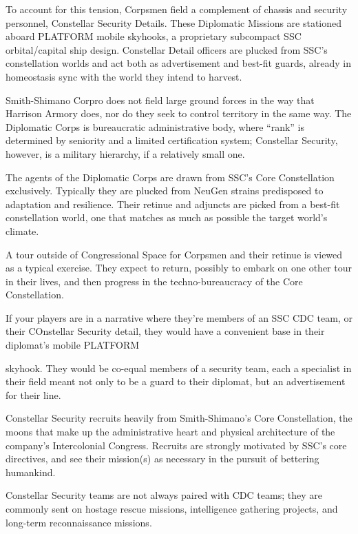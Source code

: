 To account for this tension, Corpsmen field a complement of chassis and security personnel,  
Constellar Security Details. These Diplomatic Missions are stationed aboard PLATFORM mobile  
skyhooks, a proprietary subcompact SSC orbital/capital ship design. Constellar Detail officers are  
plucked from SSC’s constellation worlds and act both as advertisement and best-fit guards,  
already in homeostasis sync with the world they intend to harvest.   

Smith-Shimano Corpro does not field large ground forces in the way that Harrison Armory does,  
nor do they seek to control territory in the same way. The Diplomatic Corps is bureaucratic  
administrative body, where “rank” is determined by seniority and a limited certification system;  
Constellar Security, however, is a military hierarchy, if a relatively small one.    

The agents of the Diplomatic Corps are drawn from SSC’s Core Constellation exclusively.  
Typically they are plucked from NeuGen strains predisposed to adaptation and resilience. Their  
retinue and adjuncts are picked from a best-fit constellation world, one that matches as much as  
possible the target world’s climate.   

A tour outside of Congressional Space for Corpsmen and their retinue is viewed as a typical  
exercise. They expect to return, possibly to embark on one other tour in their lives, and then  
progress in the techno-bureaucracy of the Core Constellation.         

If your players are in a narrative where they’re members of an SSC CDC team, or their COnstellar  
Security detail, they would have  a convenient base in their diplomat’s mobile PLATFORM  

                                                                                                          


skyhook. They would be co-equal members of a security team, each a specialist in their field  
meant not only to be a guard to their diplomat, but an advertisement for their line.  

Constellar Security recruits heavily from Smith-Shimano’s Core Constellation, the moons that  
make up the administrative heart and physical architecture of the company’s Intercolonial  
Congress. Recruits are strongly motivated by SSC’s core directives, and see their mission(s) as  
necessary in the pursuit of bettering humankind.   

Constellar Security teams are not always paired with CDC teams; they are commonly sent on  
hostage rescue missions, intelligence gathering projects, and long-term reconnaissance missions.     
         
